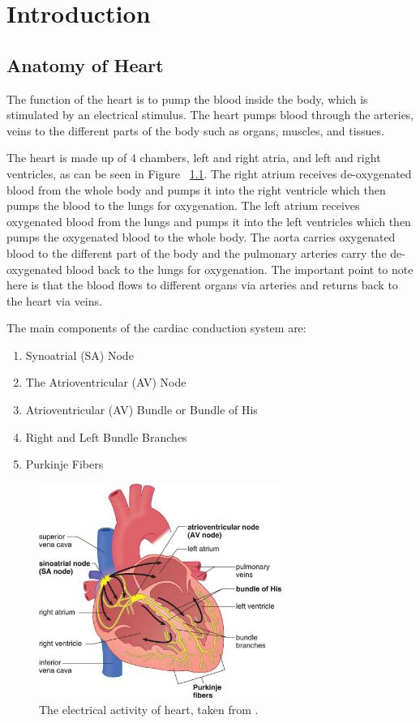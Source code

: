 \chapter{Introduction}


\section{Anatomy of Heart}
The function of the heart is to pump the blood inside the body, which is stimulated by an electrical stimulus. The heart pumps blood through the arteries, veins to the different parts of the body such as organs, muscles, and tissues.

The heart is made up of 4 chambers, left and right atria, and left and right ventricles, as can be seen in Figure ~\ref{fig:heart_anatomy}. The right atrium receives de-oxygenated blood from the whole body and pumps it into the right ventricle which then pumps the blood to the lungs for oxygenation. The left atrium receives oxygenated blood from the lungs and pumps it into the left ventricles which then pumps the oxygenated blood to the whole body. The aorta carries oxygenated blood to the different part of the body and the pulmonary arteries carry the de-oxygenated blood back to the lungs for oxygenation. The important point to note here is that the blood flows to different organs via arteries and returns back to the heart via veins.

The main components of the cardiac conduction system are:
\begin{enumerate}
	\item Synoatrial (SA) Node
	\item The Atrioventricular (AV) Node
	\item Atrioventricular (AV) Bundle or Bundle of His
	\item Right and Left Bundle Branches
	\item Purkinje Fibers
\end{enumerate}


\begin{figure}[htpb]
	\centering
	\includegraphics[width=\textwidth,height=7cm,keepaspectratio=true]{images/electric_activity_heart}
	\caption{
		The electrical activity of heart, taken from \cite{electric_activity_heart}.
	}
	\label{fig:heart_anatomy}
\end{figure}




